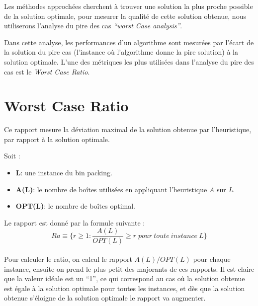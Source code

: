 \documentclass[class=article, crop=false]{standalone}
\begin{document}
Les méthodes approchées cherchent à trouver une solution la plus proche possible de la solution optimale,
pour mesurer la qualité de cette solution obtenue, nous utiliserons l’analyse du pire des cas \emph{“worst Case analysis”}.

Dans cette analyse, les performances d’un algorithme sont mesurées par l’écart de la solution du pire cas
(l’instance où l’algorithme donne la pire solution) à la solution optimale.
L’une des métriques les plus utilisées dans l’analyse du pire des cas est le \emph{Worst Case Ratio}.

\section*{Worst Case Ratio}
Ce rapport mesure la déviation maximal de la solution obtenue par l’heuristique, par rapport à la solution optimale. 

Soit :
\begin{itemize}
    \item \textbf{L}: une instance du bin packing.
    \item \textbf{A(L)}: le nombre de boîtes utilisées en appliquant l’heuristique \emph{A} sur \emph{L}.
    \item \textbf{OPT(L)}: le nombre de boîtes optimal.
\end{itemize}
Le rapport est donné par la formule suivante :\\
\[ Ra\equiv \{r \geq 1 : \frac{A(L)}{OPT(L)} \geq r \; pour\: toute\: instance\: L\}\]\\
Pour calculer le ratio, on calcul le rapport  $A(L)/OPT(L)$  pour chaque instance, ensuite on prend le plus petit des majorants de ces rapports.
Il est claire que la valeur idéale est un “1”, ce qui correspond au cas où la solution obtenue est  égale à la solution optimale pour toutes les instances, et dès que la solution obtenue s’éloigne de la solution optimale le rapport va augmenter.
\end{document}
